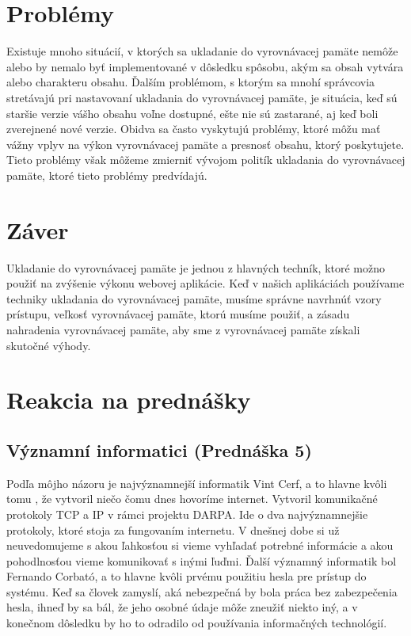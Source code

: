 \documentclass[10pt,oneside,slovak,a4paper]{article}
\begin{document}
\section{Problémy}
\quad
Existuje mnoho situácií, v ktorých sa ukladanie do vyrovnávacej pamäte nemôže alebo by nemalo byť implementované v dôsledku spôsobu, akým sa obsah vytvára  alebo charakteru obsahu. Ďalším problémom, s ktorým sa mnohí správcovia stretávajú pri nastavovaní ukladania do vyrovnávacej pamäte, je situácia, keď sú staršie verzie vášho obsahu voľne dostupné, ešte nie sú zastarané, aj keď boli zverejnené nové verzie. Obidva sa často vyskytujú problémy, ktoré môžu mať vážny vplyv na výkon vyrovnávacej pamäte a presnosť obsahu, ktorý poskytujete. Tieto problémy však môžeme zmierniť vývojom politík ukladania do vyrovnávacej pamäte, ktoré tieto problémy predvídajú.


\section{Záver}
\quad
Ukladanie do vyrovnávacej pamäte je jednou z hlavných techník, ktoré možno použiť na zvýšenie výkonu webovej aplikácie. Keď v našich aplikáciách používame techniky ukladania do vyrovnávacej pamäte, musíme správne navrhnúť vzory prístupu, veľkosť vyrovnávacej pamäte, ktorú musíme použiť, a zásadu nahradenia vyrovnávacej pamäte, aby sme z vyrovnávacej pamäte získali skutočné výhody.



\section{Reakcia na prednášky}


\subsection{Významní informatici (Prednáška 5)}
\quad Podľa môjho názoru je najvýznamnejší informatik Vint Cerf, a to hlavne kvôli tomu , že vytvoril niečo čomu dnes hovoríme internet. Vytvoril komunikačné protokoly TCP a IP v rámci projektu DARPA. Ide o dva najvýznamnejšie protokoly, ktoré stoja za fungovaním internetu. V dnešnej dobe si už neuvedomujeme  s akou ľahkosťou si vieme vyhľadať potrebné informácie a akou pohodlnosťou vieme komunikovať s inými ľuďmi. Ďalší významný informatik bol  Fernando Corbató, a to hlavne kvôli prvému použitiu hesla pre prístup do systému. Keď sa človek zamyslí, aká nebezpečná by bola práca bez zabezpečenia hesla, ihneď by sa bál, že jeho osobné údaje môže zneužiť niekto iný, a v konečnom dôsledku by ho to odradilo od používania informačných technológií.
\end{document}
